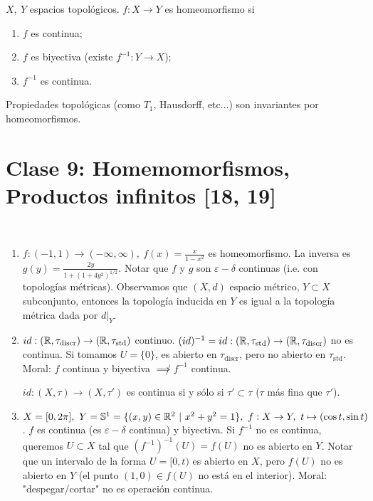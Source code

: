 \documentclass[a4paper]{report}
\begin{document}
	\begin{definition}[homeomorfismo]
		$X,\ Y$ espacios topológicos. $f:X \to Y$ es homeomorfismo si
		\begin{enumerate}
			\item $f$ es continua;

			\item $f$ es biyectiva (existe $f^{-1}:Y \to X$);

			\item $f^{-1}$ es continua.
		\end{enumerate}
	\end{definition}

	\begin{remark}
		Propiedades topológicas (como $T_1$, Hausdorff, etc...) son invariantes por homeomorfismos.
	\end{remark}


\section{Clase 9: Homemomorfismos, Productos infinitos [18, 19]}

\begin{eg}~
	\begin{enumerate}
		\item $f: (-1,1) \to (-\infty,\infty),\ f(x) = \frac{x}{1-x^2}$ es homeomorfismo. La inversa es $g(y) = \frac{2y}{1+(1+4y^2)^{1/2}}$. Notar que $f$ y $g$ son $\varepsilon-\delta$ continuas (i.e. con topologías métricas). Observamos que $(X,d)$ espacio métrico, $Y\subset X$ subconjunto, entonces la topología inducida en $Y$ es igual a la topología métrica dada por $d|_{Y}$.

		\item $id : (\mathbb{R},\tau_{\text{discr}})\to(\mathbb{R},\tau_{\text{std}})$ continuo. $(id)^{-1} = id: (\mathbb{R},\tau_{\text{std}}) \to (\mathbb{R}, \tau_{\text{discr}})$ no es continua. Si tomamos $U = \{0\}$, es abierto en $\tau_{\text{discr}}$, pero no abierto en $\tau_{\text{std}}$. Moral: $f$ continua y biyectiva $\not\implies f^{-1}$ continua. 
		\begin{remark}
			$id: (X,\tau) \to (X,\tau')$ es continua si y sólo si $\tau' \subset \tau$ ($\tau$ más fina que $\tau'$).
		\end{remark}

		\item $X = [0,2\pi],\ Y = \mathbb{S}^1 = \{(x,y) \in \mathbb{R}^2 \ | \ x^2 + y^2 = 1 \},\ f: X \to Y,\ t \mapsto (\cos t,\sin t)$. $f$ es continua (es $\varepsilon-\delta$ continua) y biyectiva. Si $f^{-1}$ no es continua, queremos $U\subset X$ tal que $(f^{-1})^{-1}(U) = f(U)$ no es abierto en $Y$. Notar que un intervalo de la forma $U = [0,t)$ es abierto en $X$, pero $f(U)$ no es abierto en $Y$ (el punto $(1,0) \in f(U)$ no está en el interior). Moral: "despegar/cortar" no es operación continua.
	\end{enumerate}
\end{eg}
\end{document}
